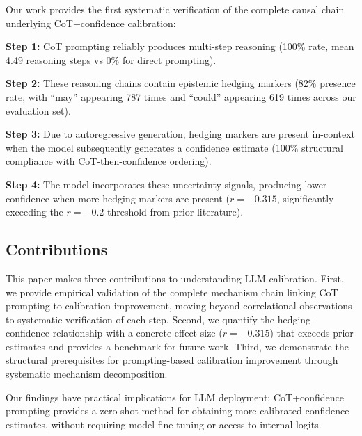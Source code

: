 Our work provides the first systematic verification of the complete causal chain underlying CoT+confidence calibration:

\textbf{Step 1:} CoT prompting reliably produces multi-step reasoning (100\% rate, mean 4.49 reasoning steps vs 0\% for direct prompting).

\textbf{Step 2:} These reasoning chains contain epistemic hedging markers (82\% presence rate, with ``may'' appearing 787 times and ``could'' appearing 619 times across our evaluation set).

\textbf{Step 3:} Due to autoregressive generation, hedging markers are present in-context when the model subsequently generates a confidence estimate (100\% structural compliance with CoT-then-confidence ordering).

\textbf{Step 4:} The model incorporates these uncertainty signals, producing lower confidence when more hedging markers are present ($r=-0.315$, significantly exceeding the $r=-0.2$ threshold from prior literature).

\subsection{Contributions}

This paper makes three contributions to understanding LLM calibration. First, we provide empirical validation of the complete mechanism chain linking CoT prompting to calibration improvement, moving beyond correlational observations to systematic verification of each step. Second, we quantify the hedging-confidence relationship with a concrete effect size ($r=-0.315$) that exceeds prior estimates and provides a benchmark for future work. Third, we demonstrate the structural prerequisites for prompting-based calibration improvement through systematic mechanism decomposition.

Our findings have practical implications for LLM deployment: CoT+confidence prompting provides a zero-shot method for obtaining more calibrated confidence estimates, without requiring model fine-tuning or access to internal logits.

